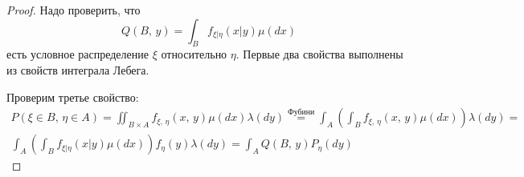 \begin{proof}
	Надо проверить, что
	\[Q(B,\, y) = \int_Bf_{\xi | \eta}(x|y)\mu(dx)\]
	есть условное распределение $\xi$ относительно $\eta$. Первые два свойства выполнены из свойств интеграла Лебега.

	Проверим третье свойство:
	\begin{align*}
		P(\xi \in B,\, \eta \in A) = \iint_{B \times A} f_{\xi,\, \eta}(x,\, y)\mu(dx)\lambda(dy) \stackrel{\text{Фубини}}{=} \int_A\left(\int_B f_{\xi,\, \eta}(x,\,y)\mu(dx)\right)\lambda(dy) = \\
		\int_A\left(\int_B f_{\xi | \eta}(x | y)\mu(dx)\right)f_\eta(y)\lambda(dy) = \int_A Q(B,\,y)P_\eta(dy)
	\end{align*}
\end{proof}
